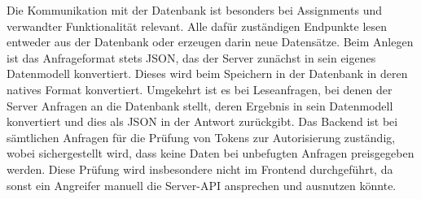 Die Kommunikation mit der Datenbank ist besonders bei Assignments und verwandter Funktionalität relevant.
Alle dafür zuständigen Endpunkte lesen entweder aus der Datenbank oder erzeugen darin neue Datensätze.
Beim Anlegen ist das Anfrageformat stets JSON, das der Server zunächst in sein eigenes Datenmodell konvertiert.
Dieses wird beim Speichern in der Datenbank in deren natives Format konvertiert.
Umgekehrt ist es bei Leseanfragen, bei denen der Server Anfragen an die Datenbank stellt, deren Ergebnis in sein Datenmodell konvertiert und dies als JSON in der Antwort zurückgibt.
Das Backend ist bei sämtlichen Anfragen für die Prüfung von Tokens zur Autorisierung zuständig, wobei sichergestellt wird, dass keine Daten bei unbefugten Anfragen preisgegeben werden.
Diese Prüfung wird insbesondere nicht im Frontend durchgeführt, da sonst ein Angreifer manuell die Server-API ansprechen und ausnutzen könnte.
